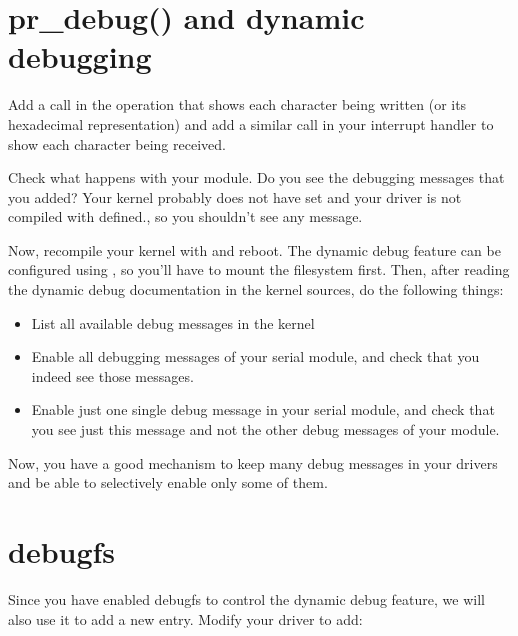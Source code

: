 
\section{pr\_debug() and dynamic debugging}

Add a  call in the  operation that shows
each character being written (or its hexadecimal representation) and
add a similar  call in your interrupt handler to show
each character being received.

Check what happens with your module. Do you see the debugging messages
that you added? Your kernel probably does not have
 set and your driver is not compiled with
 defined., so you shouldn't see any message.

Now, recompile your kernel with  and reboot. The
dynamic debug feature can be configured using , so you'll have
to mount the  filesystem first. Then, after reading the dynamic
debug documentation in the kernel sources, do the following things:

\begin{itemize}

\item List all available debug messages in the kernel

\item Enable all debugging messages of your serial module, and check
  that you indeed see those messages.

\item Enable just one single debug message in your serial module, and
  check that you see just this message and not the other debug
  messages of your module.

\end{itemize}

Now, you have a good mechanism to keep many debug messages in your
drivers and be able to selectively enable only some of them.

\section{debugfs}

Since you have enabled debugfs to control the dynamic debug feature,
we will also use it to add a new  entry. Modify your driver to
add:

